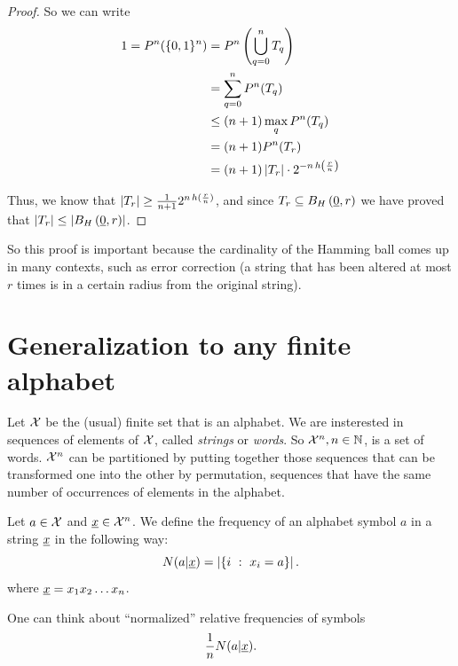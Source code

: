 \begin{proof}
	So we can write
	\begin{align*}
		1
		=
		P^n(\{0,1\}^n)
		& =
		P^n\left(\bigcup_{q=0}^nT_q\right)
		\\
		& =
		\sum_{q=0}^n P^n(T_q)
		\\
		& \le
		(n+1) \max_q P^n(T_q)
		\\
		& =
		(n+1) P^n(T_r)
		\\
		& =
		(n + 1) \left|{T_r}\right| \cdot 2^{-n \, h \left(\frac{r}{n}\right)}
	\end{align*}

	Thus, we know that $\left|{T_r}\right| \ge \frac{1}{n+1} 2^{n \, h(\frac{r}{n})}$, and since $T_r \subseteq B_H\left(\underline{0}, r\right)$ we have proved that $\left|{T_r}\right| \le \left|{B_H\left(\underline{0}, r\right)}\right|$.
\end{proof}

So this proof is important because the cardinality of the Hamming ball comes up in many contexts, such as error correction (a string that has been altered at most $r$ times is in a certain radius from the original string).

\section{Generalization to any finite alphabet}

Let $\mathcal{X}$ be the (usual) finite set that is an alphabet.
We are insterested in sequences of elements of $\mathcal{X}$, called \emph{strings} or \emph{words}.
So $\mathcal{X}^n, n \in \mathbb{N}$, is a set of words.
$\mathcal{X}^n$ can be partitioned by putting together those sequences that can be transformed one into the other by permutation, \ie sequences that have the same number of occurrences of elements in the alphabet.

\begin{definition}
	Let $a \in \mathcal{X}$ and $\underline{x} \in \mathcal{X}^n$.
	We define the frequency of an alphabet symbol $a$ in a string $\underline{x}$ in the following way:  
	\begin{equation*}
	N(a | \underline{x}) = \left|{\{i\ :\ x_i = a\}}\right|.
	\end{equation*}
	where $\underline{x} = x_1 x_2 \ldots x_n$.
\end{definition}

One can think about ``normalized'' relative frequencies of symbols
\begin{equation*}
	\frac{1}{n} N(a|\underline{x}).
\end{equation*}

